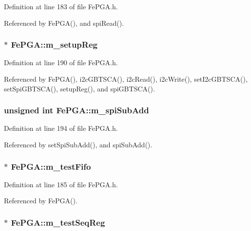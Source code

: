 Definition at line 183 of file FePGA.h.

Referenced by FePGA(), and spiRead().\hypertarget{classFePGA_a0255fe229013986b4387c3a75ddf4e97}{
\subsubsection[{m\_\-setupReg}]{$\ast$ {\bf FePGA::m\_\-setupReg}}}
\label{classFePGA_a0255fe229013986b4387c3a75ddf4e97}


Definition at line 190 of file FePGA.h.

Referenced by FePGA(), i2cGBTSCA(), i2cRead(), i2cWrite(), setI2cGBTSCA(), setSpiGBTSCA(), setupReg(), and spiGBTSCA().\hypertarget{classFePGA_a4f2f5d175aeb6dcaf497f81d2f075411}{
\subsubsection[{m\_\-spiSubAdd}]{\setlength{\rightskip}{0pt plus 5cm}unsigned int {\bf FePGA::m\_\-spiSubAdd}}}
\label{classFePGA_a4f2f5d175aeb6dcaf497f81d2f075411}


Definition at line 194 of file FePGA.h.

Referenced by setSpiSubAdd(), and spiSubAdd().\hypertarget{classFePGA_a97fc9347c90d9a31d99ccb499cc06eee}{
\subsubsection[{m\_\-testFifo}]{$\ast$ {\bf FePGA::m\_\-testFifo}}}
\label{classFePGA_a97fc9347c90d9a31d99ccb499cc06eee}


Definition at line 185 of file FePGA.h.

Referenced by FePGA().\hypertarget{classFePGA_a67bc3c8f923b673100974fd86096393e}{
\subsubsection[{m\_\-testSeqReg}]{$\ast$ {\bf FePGA::m\_\-testSeqReg}}}
\label{classFePGA_a67bc3c8f923b673100974fd86096393e}


